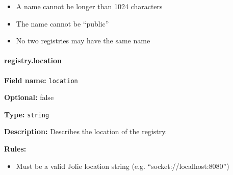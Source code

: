 \begin{itemize}
\tightlist
\item
  A name cannot be longer than 1024 characters
\item
  The name cannot be ``public''
\item
  No two registries may have the same name
\end{itemize}

\hypertarget{location}{\paragraph{registry.location}\label{location}}

\textbf{Field name:} \texttt{location}

\textbf{Optional:} false

\textbf{Type:} \texttt{string}

\textbf{Description:} Describes the location of the registry.

\textbf{Rules:}

\begin{itemize}
\tightlist
\item
  Must be a valid Jolie location string (e.g.
  ``socket://localhost:8080'')
\end{itemize}
